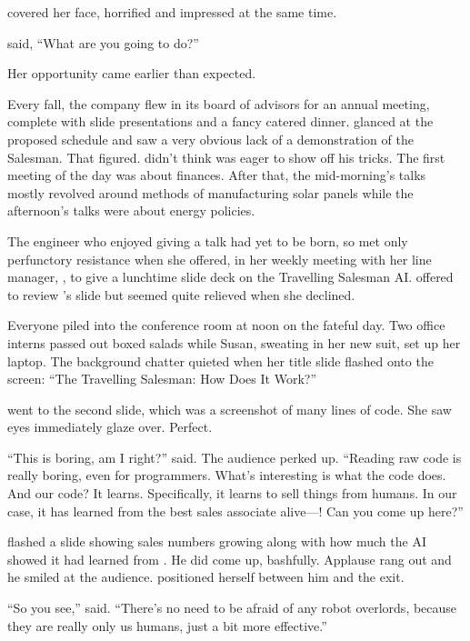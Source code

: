 {\protag} covered her face, horrified and impressed at the same time.

{\sidetag} said, ``What are you going to do?''

\sectionBreak{}

Her opportunity came earlier than expected.

Every fall, the company flew in its board of advisors for an annual meeting, complete with slide presentations and a fancy catered dinner. {\protag} glanced at the proposed schedule and saw a very obvious lack of a demonstration of the Salesman. That figured. {\protag} didn't think \energyJerk{} was eager to show off his tricks. The first meeting of the day was about finances. After that, the mid-morning's talks mostly revolved around methods of manufacturing solar panels while the afternoon's talks were about energy policies.

The engineer who enjoyed giving a talk had yet to be born, so {\protag} met only perfunctory resistance when she offered, in her weekly meeting with her line manager, \Boss{}, to give a lunchtime slide deck on the Travelling Salesman AI. \Boss{} offered to review {\protag}'s slide but seemed quite relieved when she declined.

Everyone piled into the conference room at noon on the fateful day. Two office interns passed out boxed salads while Susan, sweating in her new suit, set up her laptop. The background chatter quieted when her title slide flashed onto the screen: ``The Travelling Salesman: How Does It Work?''

{\protag} went to the second slide, which was a screenshot of many lines of code. She saw eyes immediately glaze over. Perfect.

``This is boring, am I right?'' {\protag} said. The audience perked up. ``Reading raw code is really boring, even for programmers. What's interesting is what the code does. And our code? It learns. Specifically, it learns to sell things from humans. In our case, it has learned from the best sales associate alive---\energyJerk{}! Can you come up here?''

{\protag} flashed a slide showing sales numbers growing along with how much the AI showed it had learned from \energyJerk{}. He did come up, bashfully. Applause rang out and he smiled at the audience. {\protag} positioned herself between him and the exit.

``So you see,'' {\protag} said. ``There's no need to be afraid of any robot overlords, because they are really only us humans, just a bit more effective.''


